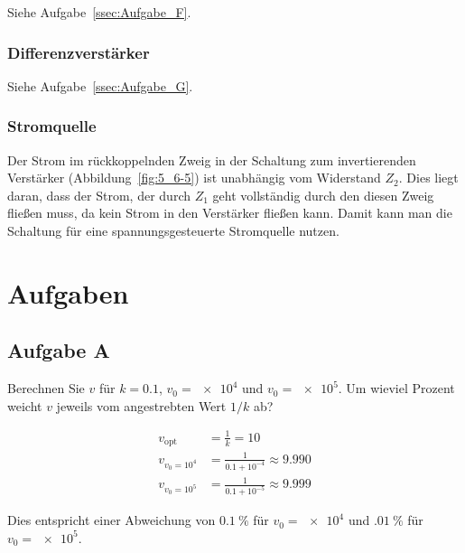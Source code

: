 Siehe Aufgabe~\ref{ssec:Aufgabe_F}.

\FloatBarrier
\subsubsection{Differenzverstärker}

Siehe Aufgabe~\ref{ssec:Aufgabe_G}.

\FloatBarrier
\subsubsection{Stromquelle}

Der Strom im rückkoppelnden Zweig in der Schaltung zum invertierenden
Verstärker (Abbildung~\ref{fig:5_6-5}) ist unabhängig vom Widerstand $Z_2$.
Dies liegt daran, dass der Strom, der durch $Z_1$ geht vollständig durch den
diesen Zweig fließen muss, da kein Strom in den Verstärker fließen kann. Damit
kann man die Schaltung für eine spannungsgesteuerte Stromquelle nutzen.



\FloatBarrier
\section{Aufgaben}

\FloatBarrier
\subsection{Aufgabe A}

\begin{problem}
	Berechnen Sie $v$ für $k = \num{0.1}$, $v_0 = \num{e4}$ und $v_0 =
	\num{e5}$. Um wieviel Prozent weicht $v$ jeweils vom angestrebten Wert $1 /
	k$ ab?
\end{problem}

\begin{align*}
    v_\text{opt} &= \frac 1k = 10 \\
	v_{v_0 = 10^4} &= \frac 1{\num{0.1} + 10^{-4}} \approx \num{9.990} \\
	v_{v_0 = 10^5} &= \frac 1{\num{0.1} + 10^{-5}} \approx \num{9.999}
\end{align*}

Dies entspricht einer Abweichung von $\SI{0.1}\percent$ für $v_0 = \num{e4}$
und $\SI{.01}\percent$ für $v_0 = \num{e5}$.


